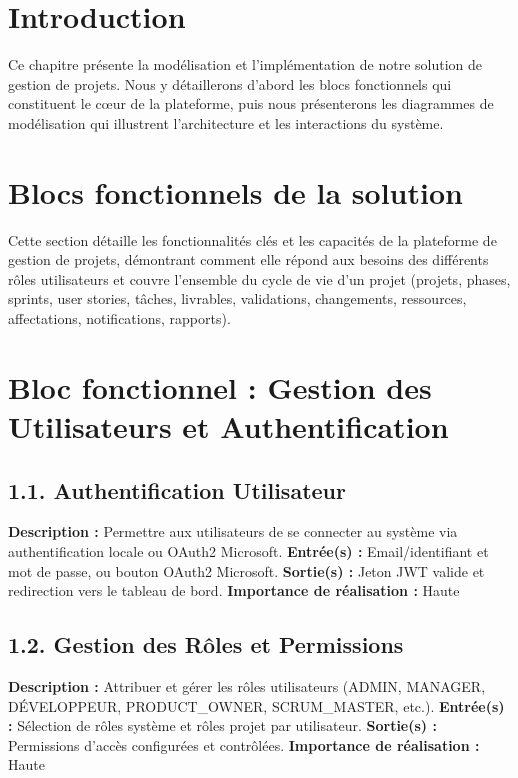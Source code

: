 \section{Introduction}

Ce chapitre présente la modélisation et l'implémentation de notre solution de gestion de projets. Nous y détaillerons d'abord les blocs fonctionnels qui constituent le cœur de la plateforme, puis nous présenterons les diagrammes de modélisation qui illustrent l'architecture et les interactions du système.

\section{Blocs fonctionnels de la solution}

Cette section détaille les fonctionnalités clés et les capacités de la plateforme de gestion de projets, démontrant comment elle répond aux besoins des différents rôles utilisateurs et couvre l'ensemble du cycle de vie d'un projet (projets, phases, sprints, user stories, tâches, livrables, validations, changements, ressources, affectations, notifications, rapports).

\section{Bloc fonctionnel : Gestion des Utilisateurs et Authentification}

\subsection{1.1. Authentification Utilisateur}
\textbf{Description :} Permettre aux utilisateurs de se connecter au système via authentification locale ou OAuth2 Microsoft.
\textbf{Entrée(s) :} Email/identifiant et mot de passe, ou bouton OAuth2 Microsoft.
\textbf{Sortie(s) :} Jeton JWT valide et redirection vers le tableau de bord.
\textbf{Importance de réalisation :} Haute

\subsection{1.2. Gestion des Rôles et Permissions}
\textbf{Description :} Attribuer et gérer les rôles utilisateurs (ADMIN, MANAGER, DÉVELOPPEUR, PRODUCT\_OWNER, SCRUM\_MASTER, etc.).
\textbf{Entrée(s) :} Sélection de rôles système et rôles projet par utilisateur.
\textbf{Sortie(s) :} Permissions d'accès configurées et contrôlées.
\textbf{Importance de réalisation :} Haute

